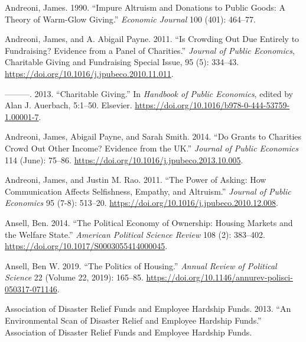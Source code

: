 \documentclass[
  11pt,
  oneside]{article}
\newlength{\cslhangindent}
\newenvironment{CSLReferences}[2] %
 {\begin{list}{}{%
  \setlength{\itemindent}{0pt}
  \setlength{\leftmargin}{0pt}
  \setlength{\parsep}{0pt}
  \ifodd #1
   \setlength{\leftmargin}{\cslhangindent}
   \setlength{\itemindent}{-1\cslhangindent}
  \fi
  \setlength{\itemsep}{#2\baselineskip}}}
 {\end{list}}
\begin{document}
\begin{CSLReferences}{1}{0}
Andreoni, James. 1990. {``Impure {Altruism} and {Donations} to {Public Goods}: {A Theory} of {Warm-Glow Giving}.''} \emph{Economic Journal} 100 (401): 464--77.

Andreoni, James, and A. Abigail Payne. 2011. {``Is Crowding Out Due Entirely to Fundraising? {Evidence} from a Panel of Charities.''} \emph{Journal of Public Economics}, Charitable {Giving} and {Fundraising Special Issue}, 95 (5): 334--43. \url{https://doi.org/10.1016/j.jpubeco.2010.11.011}.

---------. 2013. {``Charitable {Giving}.''} In \emph{Handbook of {Public Economics}}, edited by Alan J. Auerbach, 5:1--50. Elsevier. \url{https://doi.org/10.1016/b978-0-444-53759-1.00001-7}.

Andreoni, James, Abigail Payne, and Sarah Smith. 2014. {``Do Grants to Charities Crowd Out Other Income? {Evidence} from the {UK}.''} \emph{Journal of Public Economics} 114 (June): 75--86. \url{https://doi.org/10.1016/j.jpubeco.2013.10.005}.

Andreoni, James, and Justin M. Rao. 2011. {``The Power of Asking: {How} Communication Affects Selfishness, Empathy, and Altruism.''} \emph{Journal of Public Economics} 95 (7-8): 513--20. \url{https://doi.org/10.1016/j.jpubeco.2010.12.008}.

Ansell, Ben. 2014. {``The {Political Economy} of {Ownership}: {Housing Markets} and the {Welfare State}.''} \emph{American Political Science Review} 108 (2): 383--402. \url{https://doi.org/10.1017/S0003055414000045}.

Ansell, Ben W. 2019. {``The {Politics} of {Housing}.''} \emph{Annual Review of Political Science} 22 (Volume 22, 2019): 165--85. \url{https://doi.org/10.1146/annurev-polisci-050317-071146}.

Association of Disaster Relief Funds and Employee Hardship Funds. 2013. {``An {Environmental Scan} of {Disaster Relief} and {Employee Hardship Funds}.''} {Association of Disaster Relief Funds and Employee Hardship Funds}.


\end{CSLReferences}
\end{document}
